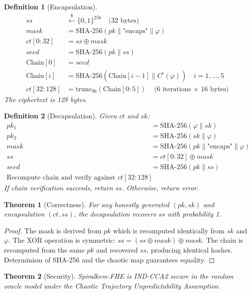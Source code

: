 \documentclass{article}
\newtheorem{theorem}{Theorem}[section]
\newtheorem{definition}{Definition}[section]
\begin{document}
\begin{definition}[Encapsulation]
\begin{align}
ss &\xleftarrow{\$} \{0,1\}^{256} \quad \text{(32 bytes)} \\
mask &= \text{SHA-256}(pk \parallel \text{"encaps"} \parallel \varphi) \\
ct[0:32] &= ss \oplus mask \\
seed &= \text{SHA-256}(pk \parallel ss) \\
\text{Chain}[0] &= seed \\
\text{Chain}[i] &= \text{SHA-256}(\text{Chain}[i-1] \parallel C^i(\varphi)) \quad i = 1,\ldots,5 \\
ct[32:128] &= \text{trunc}_{96}(\text{Chain}[0:5]) \quad \text{(6 iterations $\times$ 16 bytes)}
\end{align}
The ciphertext is 128 bytes.
\end{definition}

\begin{definition}[Decapsulation]
Given $ct$ and $sk$:
\begin{align}
pk_1 &= \text{SHA-256}(\varphi \parallel sk) \\
pk_2 &= \text{SHA-256}(sk \parallel \varphi) \\
mask &= \text{SHA-256}(pk \parallel \text{"encaps"} \parallel \varphi) \\
ss &= ct[0:32] \oplus mask \\
seed &= \text{SHA-256}(pk \parallel ss) \\
\text{Recompute chain and verify against } ct[32:128]
\end{align}
If chain verification succeeds, return $ss$. Otherwise, return error.
\end{definition}

\begin{theorem}[Correctness]
For any honestly generated $(pk, sk)$ and encapsulation $(ct, ss)$, the decapsulation recovers $ss$ with probability 1.
\end{theorem}

\begin{proof}
The mask is derived from $pk$ which is recomputed identically from $sk$ and $\varphi$. The XOR operation is symmetric: $ss = (ss \oplus mask) \oplus mask$. The chain is recomputed from the same $pk$ and recovered $ss$, producing identical hashes. Determinism of SHA-256 and the chaotic map guarantees equality.
\end{proof}

\begin{theorem}[Security]
Spiralkem-FHE is IND-CCA2 secure in the random oracle model under the Chaotic Trajectory Unpredictability Assumption.
\end{theorem}
\end{document}
